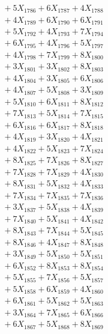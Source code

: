 \documentclass[a4paper,10pt]{article}
\begin{document}
{\begin{align}
&\;  + 5 X_{1786} + 6 X_{1787} + 4 X_{1788} \\[0.3ex]
&\;  + 4 X_{1789} + 6 X_{1790} + 6 X_{1791} \\[0.3ex]
&\;  + 5 X_{1792} + 4 X_{1793} + 7 X_{1794} \\[0.3ex]
&\;  + 6 X_{1795} + 4 X_{1796} + 5 X_{1797} \\[0.3ex]
&\;  + 4 X_{1798} + 7 X_{1799} + 8 X_{1800} \\[0.3ex]
&\;  + 3 X_{1801} + 3 X_{1802} + 8 X_{1803} \\[0.3ex]
&\;  + 4 X_{1804} + 3 X_{1805} + 6 X_{1806} \\[0.3ex]
&\;  + 4 X_{1807} + 5 X_{1808} + 3 X_{1809} \\[0.5ex]\allowbreak
&\;  + 5 X_{1810} + 6 X_{1811} + 8 X_{1812} \\[0.3ex]
&\;  + 7 X_{1813} + 5 X_{1814} + 7 X_{1815} \\[0.3ex]
&\;  + 6 X_{1816} + 6 X_{1817} + 8 X_{1818} \\[0.3ex]
&\;  + 4 X_{1819} + 3 X_{1820} + 4 X_{1821} \\[0.3ex]
&\;  + 4 X_{1822} + 5 X_{1823} + 7 X_{1824} \\[0.3ex]
&\;  + 8 X_{1825} + 7 X_{1826} + 8 X_{1827} \\[0.3ex]
&\;  + 7 X_{1828} + 7 X_{1829} + 4 X_{1830} \\[0.3ex]
&\;  + 8 X_{1831} + 5 X_{1832} + 4 X_{1833} \\[0.3ex]
&\;  + 7 X_{1834} + 7 X_{1835} + 7 X_{1836} \\[0.3ex]
&\;  + 3 X_{1837} + 5 X_{1838} + 4 X_{1839} \\[0.5ex]\allowbreak
&\;  + 7 X_{1840} + 5 X_{1841} + 4 X_{1842} \\[0.3ex]
&\;  + 8 X_{1843} + 7 X_{1844} + 5 X_{1845} \\[0.3ex]
&\;  + 8 X_{1846} + 4 X_{1847} + 8 X_{1848} \\[0.3ex]
&\;  + 3 X_{1849} + 5 X_{1850} + 5 X_{1851} \\[0.3ex]
&\;  + 6 X_{1852} + 8 X_{1853} + 8 X_{1854} \\[0.3ex]
&\;  + 5 X_{1855} + 7 X_{1856} + 5 X_{1857} \\[0.3ex]
&\;  + 5 X_{1858} + 6 X_{1859} + 4 X_{1860} \\[0.3ex]
&\;  + 6 X_{1861} + 5 X_{1862} + 5 X_{1863} \\[0.3ex]
&\;  + 3 X_{1864} + 7 X_{1865} + 6 X_{1866} \\[0.3ex]
&\;  + 6 X_{1867} + 5 X_{1868} + 8 X_{1869} \\[0.5ex]\allowbreak

\end{align}}
\end{document}
